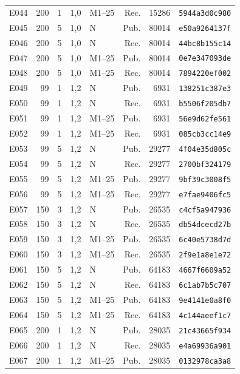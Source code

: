 \begin{longtable}{lrrrlrrl}
E044 & 200 & 1 & 1,0 & M1--25 & Rec. & 15286 & \texttt{5944a3d0c980} \\
E045 & 200 & 5 & 1,0 & N & Pub. & 80014 & \texttt{e50a9264137f} \\
E046 & 200 & 5 & 1,0 & N & Rec. & 80014 & \texttt{44bc8b155c14} \\
E047 & 200 & 5 & 1,0 & M1--25 & Pub. & 80014 & \texttt{0e7e347093de} \\
E048 & 200 & 5 & 1,0 & M1--25 & Rec. & 80014 & \texttt{7894220ef002} \\
E049 & 99 & 1 & 1,2 & N & Pub. & 6931 & \texttt{138251c387e3} \\
E050 & 99 & 1 & 1,2 & N & Rec. & 6931 & \texttt{b5506f205db7} \\
E051 & 99 & 1 & 1,2 & M1--25 & Pub. & 6931 & \texttt{56e9d62fe561} \\
E052 & 99 & 1 & 1,2 & M1--25 & Rec. & 6931 & \texttt{085cb3cc14e9} \\
E053 & 99 & 5 & 1,2 & N & Pub. & 29277 & \texttt{4f04e35d805c} \\
E054 & 99 & 5 & 1,2 & N & Rec. & 29277 & \texttt{2700bf324179} \\
E055 & 99 & 5 & 1,2 & M1--25 & Pub. & 29277 & \texttt{9bf39c3008f5} \\
E056 & 99 & 5 & 1,2 & M1--25 & Rec. & 29277 & \texttt{e7fae9406fc5} \\
E057 & 150 & 3 & 1,2 & N & Pub. & 26535 & \texttt{c4cf5a947936} \\
E058 & 150 & 3 & 1,2 & N & Rec. & 26535 & \texttt{db54dcecd27b} \\
E059 & 150 & 3 & 1,2 & M1--25 & Pub. & 26535 & \texttt{6c40e5738d7d} \\
E060 & 150 & 3 & 1,2 & M1--25 & Rec. & 26535 & \texttt{2f9e1a8e1e72} \\
E061 & 150 & 5 & 1,2 & N & Pub. & 64183 & \texttt{4667f6609a52} \\
E062 & 150 & 5 & 1,2 & N & Rec. & 64183 & \texttt{6c1ab7b5c707} \\
E063 & 150 & 5 & 1,2 & M1--25 & Pub. & 64183 & \texttt{9e4141e0a8f0} \\
E064 & 150 & 5 & 1,2 & M1--25 & Rec. & 64183 & \texttt{4c144aeef1c7} \\
E065 & 200 & 1 & 1,2 & N & Pub. & 28035 & \texttt{21c43665f934} \\
E066 & 200 & 1 & 1,2 & N & Rec. & 28035 & \texttt{e4a69936a901} \\
E067 & 200 & 1 & 1,2 & M1--25 & Pub. & 28035 & \texttt{0132978ca3a8} \\

\end{longtable}
